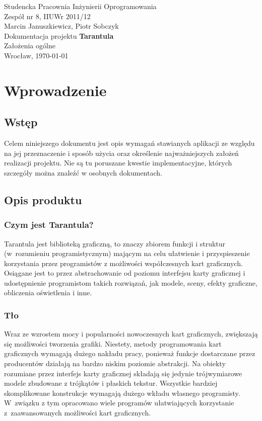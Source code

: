 \documentclass[11pt,leqno]{article}
\begin{document}
\begin{center}
\thispagestyle{empty}
{\Large Studencka Pracownia Inżynierii Oprogramowania}\\[0.5cm]
{\Large Zespół nr 8, IIUWr 2011/12}\\[2.5cm]

{\large Marcin Januszkiewicz, Piotr Sobczyk}\\[0.5cm]
{\huge Dokumentacja projektu \textbf{Tarantula}}\\[0.5cm]
{\huge Założenia ogólne}\\[0.5cm]
\vfill
{\large Wrocław, \today}
\end{center}
\newpage
\tableofcontents

\newpage


\newpage
\section{Wprowadzenie}

\subsection{Wstęp}
\noindent
Celem niniejszego dokumentu jest opis wymagań stawianych aplikacji ze względu na jej przeznaczenie i 
sposób użycia oraz określenie najważniejszych założeń realizacji projektu. 
Nie są tu poruszane kwestie implementacyjne, których szczegóły można znaleźć w osobnych dokumentach.

\subsection{Opis produktu}

\subsubsection{Czym jest Tarantula?}
\noindent
Tarantula jest biblioteką graficzną, to znaczy zbiorem funkcji i struktur (w~rozumieniu programistycznym) mającym 
na celu ułatwienie i przyspieszenie korzystania przez programistów z możliwości współczesnych kart graficznych. Osiągane jest to przez abstrachowanie od poziomu interfejsu karty graficznej i udostępnienie programistom takich rozwiązań, jak modele, sceny, efekty graficzne, obliczenia oświetlenia i inne.

\subsubsection{Tło}
\noindent
Wraz ze wzrostem mocy i popularności nowoczesnych kart graficznych, zwiększają się możliwości tworzenia grafiki. 
Niestety, metody programowania kart graficznych wymagają dużego nakładu pracy, ponieważ funkcje dostarczane przez producentów 
działają na bardzo niskim poziomie abstrakcji. Na obiekty rozumiane przez interfejs karty graficznej składają się jedynie trójwymiarowe modele zbudowane z trójkątów i płaskich tekstur. 
Wszystkie bardziej skomplikowane konstrukcje wymagają dużego wkładu własnego programisty. W~związku z tym opracowano wiele programów 
ułatwiających korzystanie z~zaawansowanych możliwości kart graficznych. 
\end{document}
